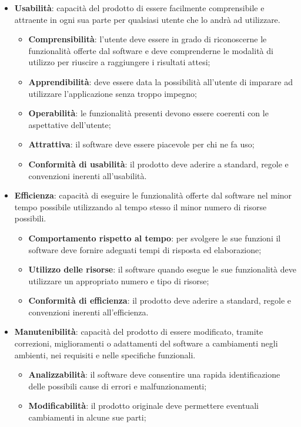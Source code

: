 \begin{itemize}
\item\textbf{Usabilità}: capacità del prodotto di essere facilmente comprensibile e attraente in ogni sua parte per qualsiasi utente che lo andrà ad utilizzare.
\begin{itemize}
\item\textbf{Comprensibilità}: l'utente deve essere in grado di riconoscerne le funzionalità offerte dal software e deve comprenderne le modalità di utilizzo per riuscire a raggiungere i risultati attesi;
\item\textbf{Apprendibilità}: deve essere data la possibilità all'utente di imparare ad utilizzare l'applicazione senza troppo impegno;
\item\textbf{Operabilità}: le funzionalità presenti devono essere coerenti con le aspettative dell'utente;
\item\textbf{Attrattiva}: il software deve essere piacevole per chi ne fa uso;
\item\textbf{Conformità di usabilità}: il prodotto deve aderire a standard, regole e convenzioni inerenti all'usabilità.
\end{itemize}
\item\textbf{Efficienza}: capacità di eseguire le funzionalità offerte dal software nel minor tempo possibile utilizzando al tempo stesso il minor numero di risorse possibili.
\begin{itemize}
\item\textbf{Comportamento rispetto al tempo}: per svolgere le sue funzioni il software deve fornire adeguati tempi di risposta ed elaborazione;
\item\textbf{Utilizzo delle risorse}: il software quando esegue le sue funzionalità deve utilizzare un appropriato numero e tipo di risorse;
\item\textbf{Conformità di efficienza}: il prodotto deve aderire a standard, regole e convenzioni inerenti all'efficienza.
\end{itemize}
\item\textbf{Manutenibilità}: capacità del prodotto di essere modificato, tramite correzioni, miglioramenti o adattamenti del software a cambiamenti negli ambienti, nei requisiti e nelle specifiche funzionali.
\begin{itemize}
\item\textbf{Analizzabilità}: il software deve consentire una rapida identificazione delle possibili cause di errori e malfunzionamenti;
\item\textbf{Modificabilità}: il prodotto originale deve permettere eventuali cambiamenti in alcune sue parti;

\end{itemize}
\end{itemize}
